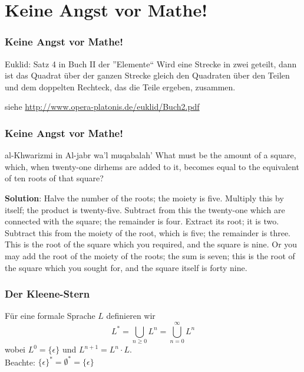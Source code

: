 \documentclass{beamer}
\begin{document}
\section{Keine Angst vor Mathe!}

\begin{frame} \frametitle{Keine Angst vor Mathe!}
	\begin{block}{Euklid: Satz 4 in Buch II der ''Elemente``}
		Wird eine Strecke in zwei geteilt, dann ist das Quadrat über der ganzen Strecke gleich den Quadraten über den Teilen und dem doppelten Rechteck, das die Teile ergeben, zusammen.
	\end{block}


	\small siehe \url{http://www.opera-platonis.de/euklid/Buch2.pdf}
\end{frame}

\begin{frame} \frametitle{Keine Angst vor Mathe!}
	\begin{block}{al-Khwarizmi in Al-jabr wa'l muqabalah'}
		\small What must be the amount of a square, which, when twenty-one
		dirhems are added to it, becomes equal to the equivalent of ten
		roots of that square?
		
		\textbf{Solution}: Halve the number of the roots; the moiety is five.
		Multiply this by itself; the product is twenty-five. Subtract from
		this the twenty-one which are connected with the square; the
		remainder is four. Extract its root; it is two. Subtract this from
		the moiety of the root, which is five; the remainder is three. This
		is the root of the square which you required, and the square is
		nine. Or you may add the root of the moiety of the roots; the
		sum is seven; this is the root of the square which you sought for,
		and the square itself is forty nine.
	\end{block}
\end{frame}

\begin{frame} \frametitle{Der Kleene-Stern}
	\begin{Definition}
		Für eine formale Sprache $L$ definieren wir
		\begin{equation*}
		L^\ast = \bigcup_{n \ge 0} L^n = \bigcup_{n = 0}^\infty L^n
		\end{equation*}
		wobei $L^0 = \{ \epsilon \}$ und $L^{n+1} = L^n \cdot L$. \\
		Beachte: $\{ \epsilon \}^\ast = \emptyset^\ast = \{ \epsilon \}$
	\end{Definition}
\end{frame}
\end{document}
